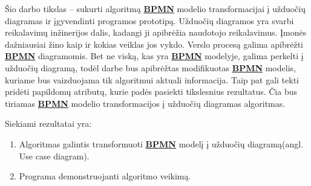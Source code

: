 \documentclass{VUMIFInfBakalaurinis}
\newcommand{\bhyperref}[2]{\hyperref[#1]{\textbf{#2}}}
\newcommand{\BPMN}{\bhyperref{section:bpmn}{BPMN}}
\begin{document}
Šio darbo tikslas – sukurti algoritmą \BPMN{} modelio transformacijai į užduočių diagramas ir įgyvendinti programos prototipą. Užduočių diagramos yra svarbi reikalavimų inžinerijos dalis, kadangi ji apibrėžia naudotojo reikalavimus. Įmonės dažniausiai žino kaip ir kokias veiklas jos vykdo. Verslo procesą galima apibrėžti \BPMN{} diagramomis. Bet ne viską, kas yra \BPMN{} modelyje, galima perkelti į užduočių diagramą, todėl darbe bus apibrėžtas modifikuotas \BPMN{} modelis, kuriame bus vaizduojama tik algoritmui aktuali informacija. Taip pat gali tekti pridėti papildomų atributų, kurie padės pasiekti tikslesnius rezultatus. Čia bus tiriamas \BPMN{} modelio transformacijos į užduočių diagramas algoritmas.

Siekiami rezultatai yra:
\begin{enumerate}
	\item Algoritmas galintis transformuoti \BPMN{} modelį į užduočių diagramą(angl. Use case diagram).
	\item Programa demonstruojanti algoritmo veikimą.
\end{enumerate}






\end{document}
